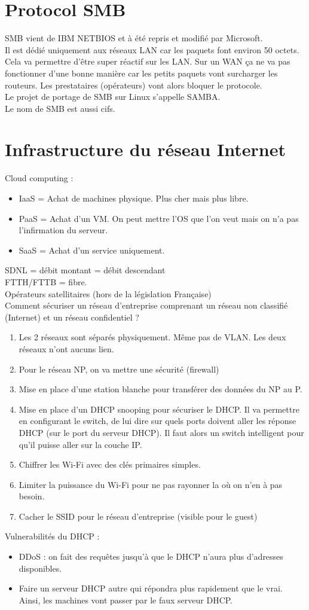 \section{Protocol SMB}
SMB vient de IBM NETBIOS et à été repris et modifié par Microsoft.\\
Il est dédié uniquement aux réseaux LAN car les paquets font environ 50 octets. Cela va permettre d'être super réactif sur les LAN. Sur un WAN ça ne va pas fonctionner d'une bonne manière car les petits paquets vont surcharger les routeurs. Les prestataires (opérateurs) vont alors bloquer le protocole.\\
Le projet de portage de SMB sur Linux s'appelle SAMBA.\\
Le nom de SMB est aussi cifs.
\newpage
\section{Infrastructure du réseau Internet}
Cloud computing :
\begin{itemize}
 \item IaaS = Achat de machines physique. Plus cher mais plus libre.
 \item PaaS = Achat d'un VM. On peut mettre l'OS que l'on veut mais on n'a pas l'infirmation du serveur.
 \item SaaS = Achat d'un service uniquement.
\end{itemize}
SDNL = débit montant = débit descendant\\
FTTH/FTTB = fibre.\\
Opérateurs satellitaires (hors de la législation Française)\\
Comment sécuriser un réseau d'entreprise comprenant un réseau non classifié (Internet) et un réseau confidentiel ?
\begin{enumerate}
 \item Les 2 réseaux sont séparés physiquement. Même pas de VLAN. Les deux réseaux n'ont aucuns lien.
 \item Pour le réseau NP, on va mettre une sécurité (firewall)
 \item Mise en place d'une station blanche pour transférer des données du NP au P.
 \item Mise en place d'un DHCP snooping pour sécuriser le DHCP. Il va permettre en configurant le switch, de lui dire sur quels ports doivent aller les réponse DHCP (sur le port du serveur DHCP). Il faut alors un switch intelligent pour qu'il puisse aller sur la couche IP.
 \item Chiffrer les Wi-Fi avec des clés primaires simples.
 \item Limiter la puissance du Wi-Fi pour ne pas rayonner la où on n'en à pas besoin.
 \item Cacher le SSID pour le réseau d'entreprise (visible pour le guest)
\end{enumerate}
Vulnerabilités du DHCP : 
\begin{itemize}
 \item DDoS : on fait des requêtes jusqu'à que le DHCP n'aura plus d'adresses disponibles.
 \item Faire un serveur DHCP autre qui répondra plus rapidement que le vrai. Ainsi, les machines vont passer par le faux serveur DHCP.
\end{itemize}
